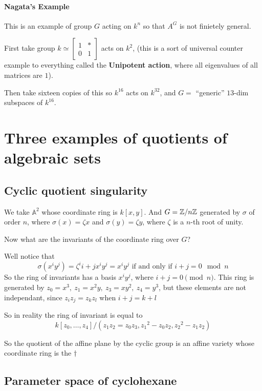\paragraph*{Nagata's Example}
This is an example of group $G$ acting on $k^n$ so that $A^G$ is not finietely general.

First take group $k\simeq \begin{bmatrix}
    1 & \ast\\
    0 & 1
\end{bmatrix}$ acts on $k^2$, (this is a sort of universal counter example to everything called the \textbf{Unipotent action}, where all eigenvalues of all matrices are $1$).

Then take sixteen copies of this so $k^{16}$ acts on $k^{32}$, and $G =$ ``generic'' $13$-dim subspaces of $k^16$.

\section{Three examples of quotients of algebraic sets}
\subsection{Cyclic quotient singularity}

We take $\mathbb{A}^2$ whose coordinate ring is $k[x,y]$. And $G = \mathbb{Z}/n\mathbb{Z}$ generated by $\sigma$ of order $n$, where $\sigma(x) = \zeta x$ and $\sigma(y) = \zeta y$, where $\zeta$ is a $n$-th root of unity.

Now what are the invariants of the coordinate ring over $G$?

Well notice that \begin{equation}
    \sigma({x^i}{y^j}) = {\zeta}^i{i+j}{x^i}{y^j} = {x^i}{y^j} \text{ if and only if }i+j = 0\mod n
\end{equation}
So the ring of invariants has a basis ${x^i}{y^j}$, where $i+j = 0\pmod n$. This ring is generated by $z_0 = x^3, \ z_1 = x^2y, \ z_3 = xy^2, \ z_4 = y^3$, but these elements are not independant, since ${z_i}{z_j} = {z_k}{z_l}$ when $i+j = k+l$

So in reality the ring of invariant is equal to \[k[z_0,\dots,z_4] / ({z_1}{z_2}={z_0}{z_3}, {z_1}^2 - {z_0}{z_2}, {z_2}^2 - {z_1}{z_2} ) \tag{$\dagger$} \]

So the quotient of the affine plane by the cyclic group is an affine variety whose coordinate ring is the $\dagger$


\subsection{Parameter space of cyclohexane}

